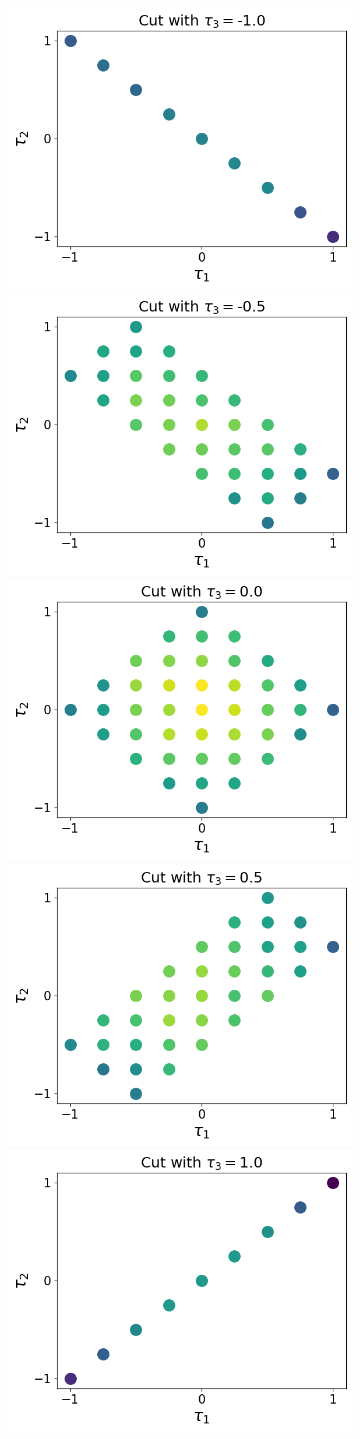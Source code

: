 \documentclass[10pt,letterpaper]{article} %
\begin{document}
\begin{figure}
\centering
\begin{subfigure}{.9\textwidth}
\centering
\includegraphics[width=.30\columnwidth]{images/corte1.png}
\includegraphics[width=.30\columnwidth]{images/corte2.png}
\includegraphics[width=.30\columnwidth]{images/corte3.png} \\[1ex]
\includegraphics[width=.30\columnwidth]{images/corte4.png}
\includegraphics[width=.30\columnwidth]{images/corte5.png}
\end{subfigure}%
\begin{subfigure}{0.1\textwidth}

\end{subfigure}
\end{figure}
\end{document}
